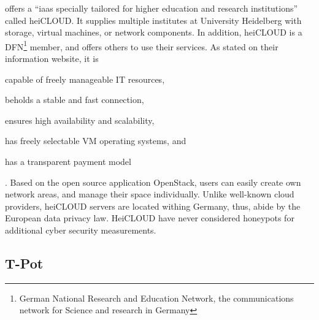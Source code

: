 \citet{urz2021} offers a \enquote{\ac{iaas} specially tailored for higher education and research institutions} called heiCLOUD.
It supplies multiple institutes at University Heidelberg with storage, virtual machines, or network components.
In addition, heiCLOUD is a DFN\footnote{German National Research and Education Network,  the communications network for Science and research in Germany} member, and offers others to use their services.
As stated on their information website\cite{heicloud2021}, it is
\begin{enumerate*}[label=(\roman*)]
    \item capable of freely manageable IT resources,
    \item beholds a stable and fast connection,
    \item ensures high availability and scalability,
    \item has freely selectable VM operating systems, and
    \item has a transparent payment model
\end{enumerate*} \cite{heicloud2021}.
Based on the open source application OpenStack, users can easily create own network areas, and manage their space individually.
Unlike well-known cloud providers, heiCLOUD servers are located withing Germany, thus, abide by the European data privacy law.
HeiCLOUD have never considered honeypots for additional cyber security measurements.

\subsection{T-Pot}
\label{subsec:tpot}

